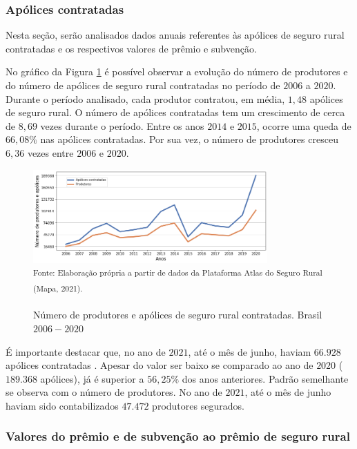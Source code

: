 \subsubsection{Apólices contratadas}

Nesta seção, serão analisados dados anuais referentes às apólices de seguro rural contratadas e os respectivos valores de prêmio e subvenção. 

No gráfico da Figura \ref{apolices_produtores} é possível observar a evolução do número de produtores e do número de apólices de seguro rural contratadas no período de $2006$ a $2020$. Durante o período analisado, cada produtor contratou, em média, $1,48$ apólices de seguro rural. O número de apólices contratadas tem um crescimento de cerca de $8,69$ vezes durante o período. Entre os anos $2014$ e $2015$, ocorre uma queda de $66,08\%$ nas apólices contratadas. Por sua vez, o número de produtores cresceu $6,36$ vezes entre $2006$ e $2020$.

\begin{figure}[H]
	\centering
	\caption{Número de produtores e apólices de seguro rural contratadas. Brasil $2006 - 2020$}
	\includegraphics[width=0.8\textwidth]{figuras/apolices_produtores.png}\\
	\small \textsuperscript {Fonte: Elaboração própria a partir de dados da Plataforma Atlas do Seguro Rural (Mapa, 2021).}
    \label{apolices_produtores}
\end{figure}

É importante destacar que, no ano de $2021$, até o mês de junho, haviam $66.928$ apólices contratadas \cite{brasil21}. Apesar do valor ser baixo se comparado ao ano de $2020$ ($189.368$ apólices), já é superior a $56,25\%$ dos anos anteriores. Padrão semelhante se observa com o número de produtores. No ano de $2021$, até o mês de junho haviam sido contabilizados $47.472$ produtores segurados.

\subsubsection{Valores do prêmio e de subvenção ao prêmio de seguro rural}

